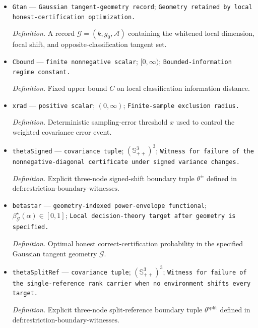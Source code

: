 \documentclass{article}
\begin{document}
\begin{itemize}
  \par\smallskip\noindent\emph{Definition.} Finite nearest-opposite information limit \(c\) along sequences with \(\delta_n(\theta_n)\to c\).
  \item \texttt{Gtan} --- \texttt{Gaussian tangent-\allowbreak{}geometry record}; \texttt{Geometry retained by local honest-\allowbreak{}certification optimization.}
  \par\smallskip\noindent\emph{Definition.} A record \(\mathcal G=(k,g_0,\mathcal A)\) containing the whitened local dimension, focal shift, and opposite-classification tangent set.
  \item \texttt{Cbound} --- \texttt{finite nonnegative scalar}; \([0,\infty)\); \texttt{Bounded-\allowbreak{}information regime constant.}
  \par\smallskip\noindent\emph{Definition.} Fixed upper bound \(C\) on local classification information distance.
  \item \texttt{xrad} --- \texttt{positive scalar}; \((0,\infty)\); \texttt{Finite-\allowbreak{}sample exclusion radius.}
  \par\smallskip\noindent\emph{Definition.} Deterministic sampling-error threshold \(x\) used to control the weighted covariance error event.
  \item \texttt{thetaSigned} --- \texttt{covariance tuple}; \((\mathbb S_{++}^{3})^{3}\); \texttt{Witness for failure of the nonnegative-\allowbreak{}diagonal certificate under signed variance changes.}
  \par\smallskip\noindent\emph{Definition.} Explicit three-node signed-shift boundary tuple \(\theta^{\pm}\) defined in \(\text{def:restriction-boundary-witnesses}\).
  \item \texttt{betastar} --- \texttt{geometry-\allowbreak{}indexed power-\allowbreak{}envelope functional}; \(\beta^{\star}_{\mathcal G}(\alpha)\in[0,1]\); \texttt{Local decision-\allowbreak{}theory target after geometry is specified.}
  \par\smallskip\noindent\emph{Definition.} Optimal honest correct-certification probability in the specified Gaussian tangent geometry \(\mathcal G\).
  \item \texttt{thetaSplitRef} --- \texttt{covariance tuple}; \((\mathbb S_{++}^{3})^{3}\); \texttt{Witness for failure of the single-\allowbreak{}reference rank carrier when no environment shifts every target.}
  \par\smallskip\noindent\emph{Definition.} Explicit three-node split-reference boundary tuple \(\theta^{\mathrm{split}}\) defined in \(\text{def:restriction-boundary-witnesses}\).
\end{itemize}
\end{document}
